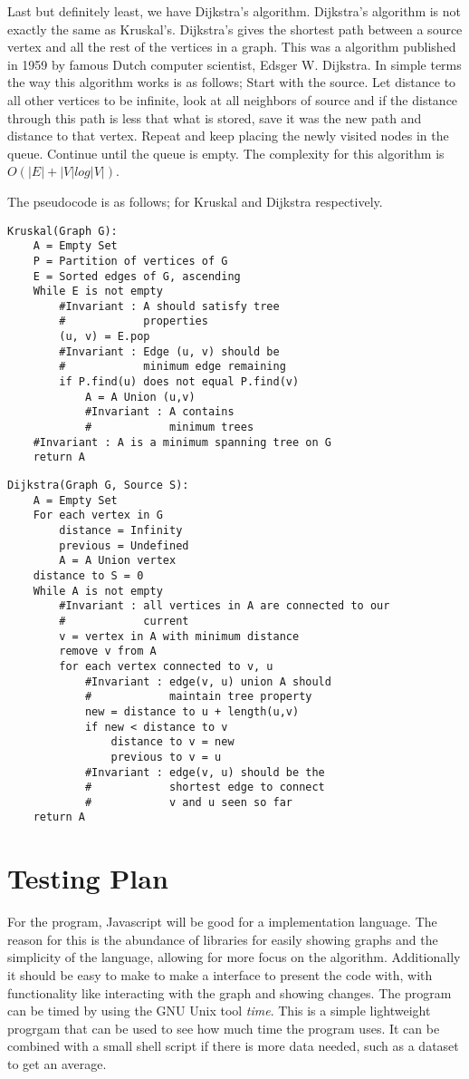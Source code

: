\documentclass{article}
\begin{document}
Last but definitely least, we have Dijkstra's algorithm. Dijkstra's algorithm
is not exactly the same as Kruskal's. Dijkstra's gives the shortest path
between a source vertex and all the rest of the vertices in a graph. This was 
a algorithm published in 1959 by famous Dutch computer scientist, Edsger W.
Dijkstra. In simple terms the way this algorithm works is as follows; Start with
the source. Let distance to all other vertices to be infinite, look at all
neighbors of source and if the distance through this path is less that what is
stored, save it was the new path and distance to that vertex. Repeat and keep
placing the newly visited nodes in the queue. Continue until the queue is
empty. The complexity for this algorithm is $O(|E| + |V|log|V|)$.



The pseudocode is as follows; for Kruskal and Dijkstra respectively.
\begin{lstlisting}
Kruskal(Graph G):
	A = Empty Set
	P = Partition of vertices of G
	E = Sorted edges of G, ascending
	While E is not empty
		#Invariant : A should satisfy tree 
		#            properties
		(u, v) = E.pop
		#Invariant : Edge (u, v) should be 
		#            minimum edge remaining
		if P.find(u) does not equal P.find(v)
			A = A Union (u,v)
			#Invariant : A contains 
			#            minimum trees
	#Invariant : A is a minimum spanning tree on G
	return A
\end{lstlisting}
\newpage
\begin{lstlisting}
Dijkstra(Graph G, Source S):
	A = Empty Set
	For each vertex in G
		distance = Infinity
		previous = Undefined
		A = A Union vertex
	distance to S = 0
	While A is not empty
		#Invariant : all vertices in A are connected to our
		#            current 
		v = vertex in A with minimum distance
		remove v from A
		for each vertex connected to v, u
			#Invariant : edge(v, u) union A should
			#            maintain tree property
			new = distance to u + length(u,v)
			if new < distance to v
				distance to v = new
				previous to v = u
			#Invariant : edge(v, u) should be the
			#            shortest edge to connect
			#            v and u seen so far
	return A
\end{lstlisting}
\section{Testing Plan}
For the program, Javascript will be good for a implementation language.
The reason for this is the abundance of libraries for easily showing graphs
and the simplicity of the language, allowing for more focus on the algorithm.
Additionally it should be easy to make to make a interface to present the 
code with, with functionality like interacting with the graph and showing
changes. The program can be timed by using the GNU Unix tool \textit{time}.
This is a simple lightweight progrgam that can be used to see how much time
the program uses. It can be combined with a small shell script if there is
more data needed, such as a dataset to get an average.
\end{document}
